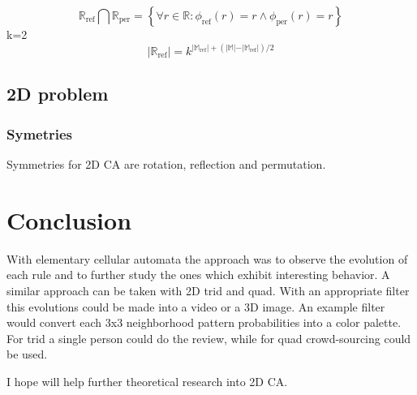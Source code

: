 \documentclass{ijuc}
\begin{document}
\[ \mathbb{R}_\mathrm{ref} \bigcap \mathbb{R}_\mathrm{per} = \left\{ \forall r \in \mathbb{R} : {\phi_\mathrm{ref}(r) = r} \wedge {\phi_\mathrm{per}(r) = r} \right\} \]
k=2
\[ \vert \mathbb{R}_\mathrm{ref} \vert = k^{ \vert \mathbb{M}_\mathrm{ref} \vert + ( \vert \mathbb{M} \vert - \vert \mathbb{M}_\mathrm{ref} \vert ) / 2 } \]


\subsection{2D problem}

\subsubsection{Symetries}

Symmetries for 2D CA are rotation, reflection and permutation.

\section{Conclusion}

With elementary cellular automata the approach was to observe the evolution of
each rule and to further study the ones which exhibit interesting behavior.
A similar approach can be taken with 2D trid and quad. With an appropriate filter
this evolutions could be made into a video or a 3D image. An example filter would
convert each 3x3 neighborhood pattern probabilities into a color palette. For trid
a single person could do the review, while for quad crowd-sourcing could be used.

I hope will help further theoretical research into 2D CA.



\appendix 
\end{document}
